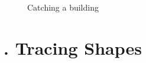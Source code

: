 \begin{appendices}
\begin{figure}
	\par
	
	\caption{Catching a building}
	\label{fig:finalstudycatchingbuilding1}
\end{figure}


\chapter{. Tracing Shapes}
\label{app:finalstudy_tracingshapes}


\end{appendices}
